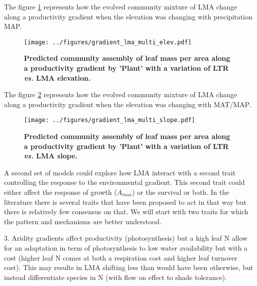 \documentclass[a4paper,11pt]{article}
\begin{document}

\clearpage

The figure \ref{fig:lma_map} represents how the evolved community mixture of LMA change along a productivity gradient when the elevation was changing with precipitation MAP.

\begin{figure}[ht]
\centering
\texttt{[image: ../figures/gradient\_lma\_multi\_elev.pdf]}
\caption{\textbf{Predicted community assembly of leaf mass per area along a productivity gradient by 'Plant' with a variation of LTR \textit{vs.} LMA elevation.}
\label{fig:lma_map}}
\end{figure}

The figure \ref{fig:lma_mat_o_map} represents how the evolved community mixture of LMA change along a productivity gradient when the elevation was changing with MAT/MAP.

\begin{figure}[ht]
\centering
\texttt{[image: ../figures/gradient\_lma\_multi\_slope.pdf]}
\caption{\textbf{Predicted community assembly of leaf mass per area along a productivity gradient by 'Plant' with a variation of LTR \textit{vs.} LMA slope.}
\label{fig:lma_mat_o_map}}
\end{figure}


\clearpage

A second set of models could explore how LMA interact with a second trait controlling the response to the environmental gradient. This second trait could either affect the response of growth ($A_{max}$) or the survival or both. In the literature there is several traits that have been proposed to act in that way but there is relatively few consensus on that. We will start with two traits for which the pattern and mechanisms are better understood.

3. Aridity gradients affect productivity (photosynthesis) but a
high leaf N allow for an adaptation in term of photosynthesis to low water availability but with a cost (higher leaf N comes at both a respiration cost and higher leaf turnover cost). This may results in LMA shifting less than would have been otherwise, but  instead differentiate species in N (with flow on effect to shade tolerance).
\end{document}
